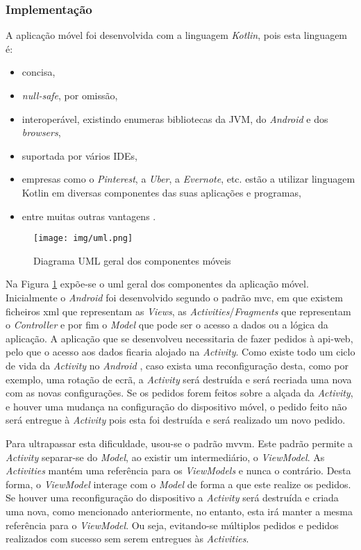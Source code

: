 \subsubsection{Implementação}

A aplicação móvel foi desenvolvida com a linguagem \textit{Kotlin}, pois esta linguagem é: 
\begin{itemize}
    \item concisa,
    \item \textit{null-safe}, por omissão,
    \item interoperável, existindo enumeras bibliotecas da JVM, do \textit{Android} e dos \textit{browsers},
    \item suportada por vários IDEs,
    \item empresas como o \textit{Pinterest}, a \textit{Uber}, a \textit{Evernote}, etc. estão a utilizar linguagem Kotlin em diversas componentes das suas aplicações e programas,
    \item entre muitas outras vantagens \cite{WhyKotlin:kotlin}.
\end{itemize}

\begin{figure}[H]
	\centering
	\texttt{[image: img/uml.png]}
	\caption{Diagrama UML geral dos componentes móveis}
	\label{mobile-app-architecture}
\end{figure}

Na Figura \ref{mobile-app-architecture} expõe-se o \acrfull{uml} geral dos componentes da aplicação móvel. Inicialmente o \textit{Android} foi desenvolvido segundo o padrão \acrshort{mvc}, em que existem ficheiros \acrfull{xml} que representam as \textit{Views}, as \textit{Activities}/\textit{Fragments} que representam o \textit{Controller} e por fim o \textit{Model} que pode ser o acesso a dados ou a lógica da aplicação. A aplicação que se desenvolveu necessitaria de fazer pedidos à \gls{api-web}, pelo que o acesso aos dados ficaria alojado na \textit{Activity}. Como existe todo um ciclo de vida da \textit{Activity} no \textit{Android} \cite{android:activityLifecycle}, caso exista uma reconfiguração desta, como por exemplo, uma rotação de ecrã, a \textit{Activity} será destruída e será recriada uma nova com as novas configurações. 
Se os pedidos forem feitos sobre a alçada da \textit{Activity}, e houver uma mudança na configuração do dispositivo móvel, o pedido feito não será entregue à \textit{Activity} pois esta foi destruída e será realizado um novo pedido. 

Para ultrapassar esta dificuldade, usou-se o padrão \acrshort{mvvm}. Este padrão permite a \textit{Activity} separar-se do \textit{Model}, ao existir um intermediário, o \textit{ViewModel}. As \textit{Activities} mantém uma referência para os \textit{ViewModels} e nunca o contrário. Desta forma, o \textit{ViewModel} interage com o \textit{Model} de forma a que este realize os pedidos. Se houver uma reconfiguração do dispositivo a \textit{Activity} será destruída e criada uma nova, como mencionado anteriormente, no entanto, esta irá manter a mesma referência para o \textit{ViewModel}. Ou seja, evitando-se múltiplos pedidos e pedidos realizados com sucesso sem serem entregues às \textit{Activities}.

